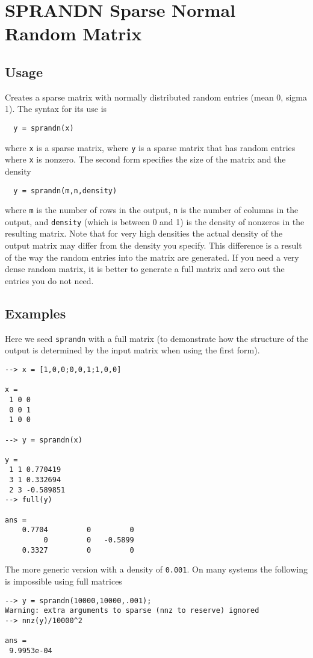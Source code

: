 \section{SPRANDN Sparse Normal Random Matrix}

\subsection{Usage}

Creates a sparse matrix with normally distributed random entries (mean 0, sigma 1).  The
syntax for its use is
\begin{verbatim}
  y = sprandn(x)
\end{verbatim}
where \verb|x| is a sparse matrix, where \verb|y| is a sparse matrix that has
random entries where \verb|x| is nonzero.  The second form specifies the
size of the matrix and the density
\begin{verbatim}
  y = sprandn(m,n,density)
\end{verbatim}
where \verb|m| is the number of rows in the output, \verb|n| is the number of 
columns in the output, and \verb|density| (which is between 0 and 1) is
the density of nonzeros in the resulting matrix.  Note that for very
high densities the actual density of the output matrix may differ from
the density you specify.  This difference is a result of the way the
random entries into the matrix are generated.  If you need a very dense
random matrix, it is better to generate a full matrix and zero out the 
entries you do not need.
\subsection{Examples}

Here we seed \verb|sprandn| with a full matrix (to demonstrate how the structure
of the output is determined by the input matrix when using the first form).
\begin{verbatim}
--> x = [1,0,0;0,0,1;1,0,0]

x = 
 1 0 0 
 0 0 1 
 1 0 0 

--> y = sprandn(x)

y = 
 1 1 0.770419
 3 1 0.332694
 2 3 -0.589851
--> full(y)

ans = 
    0.7704         0         0 
         0         0   -0.5899 
    0.3327         0         0 
\end{verbatim}
The more generic version with a density of \verb|0.001|.  On many systems the
following is impossible using full matrices
\begin{verbatim}
--> y = sprandn(10000,10000,.001);
Warning: extra arguments to sparse (nnz to reserve) ignored
--> nnz(y)/10000^2

ans = 
 9.9953e-04 
\end{verbatim}
